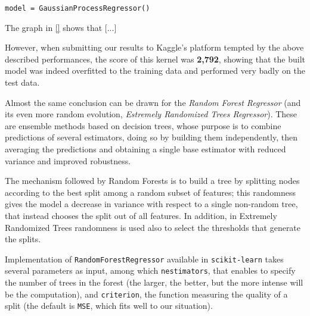 \begin{lstlisting}[firstnumber=101]
model = GaussianProcessRegressor()
\end{lstlisting}

The graph in \ref{} shows that [...]


However, when submitting our results to Kaggle's platform tempted by the above described performances, the score of this kernel was \textbf{2,792}, showing that the built model was indeed overfitted to the training data and performed very badly on the test data.



\bigbreak

Almost the same conclusion can be drawn for the \textit{Random Forest Regressor} (and its even more random evolution, \textit{Estremely Randomized Trees Regressor}). These are ensemble methods based on decision trees, whose purpose is to combine predictions of several estimators, doing so by building them independently, then averaging the predictions and obtaining a single base estimator with reduced variance and improved robustness.

The mechanism followed by Random Forests is to build a tree by splitting nodes according to the best split among a random subset of features; this randomness gives the model a decrease in variance with respect to a single non-random tree, that instead chooses the split out of all features. In addition, in Extremely Randomized Trees randomness is used also to select the thresholds that generate the splits.

Implementation of \texttt{RandomForestRegressor} available in \texttt{scikit-learn} takes several parameters as input, among which \texttt{n\textunderscore estimators}, that enables to specify the number of trees in the forest (the larger, the better, but the more intense will be the computation), and \texttt{criterion}, the function measuring the quality of a split (the default is \texttt{MSE}, which fits well to our situation).

